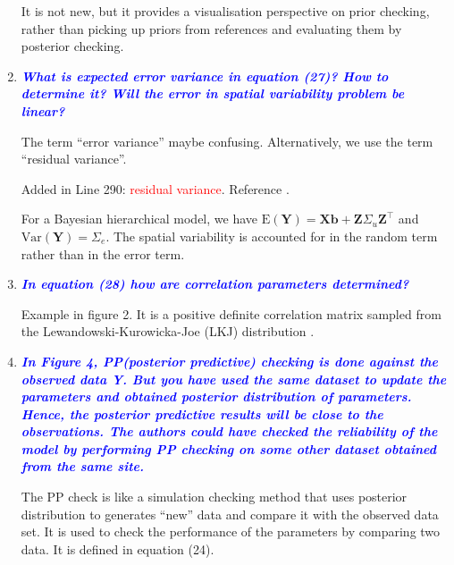 \documentclass[a4paper]{article}   	%
\newcommand{\E}{\mathrm{E}}
\newcommand{\Var}{\mathrm{Var}}
\newcommand{\qtitle}[1]{\textit{\textbf{#1}}}
\begin{document}
\begin{enumerate}
    It is not new, but it provides a visualisation perspective on prior checking, rather than picking up priors from references and evaluating them by posterior checking. 
    
    \item \qtitle{\textcolor{blue}{What is expected error variance in equation (27)? How to determine it? Will the error in spatial variability problem be linear?}}
    
	The term ``error variance'' maybe confusing. Alternatively, we use the term ``residual variance''. 
	
	Added in Line 290: \textcolor{red}{residual variance}. Reference \textcite{Gabry2019Visualization}. 
	
	For a Bayesian hierarchical model, we have $\E(\bm{Y}) = \bm{X}\bm{b} + \bm{Z}\Sigma_u\bm{Z}^\top$ and $\Var(\bm{Y}) = \Sigma_e$. The spatial variability is accounted for in the random term rather than in the error term. 
    
    \item \qtitle{\textcolor{blue}{In equation (28) how are correlation parameters determined?}}
    
    Example in figure 2. It is a positive definite correlation matrix sampled from the Lewandowski-Kurowicka-Joe (LKJ) distribution \parencite{Lewandowski2009Generating, McElreath2015Statistical}. 
    
    \item \qtitle{\textcolor{blue}{In Figure 4, PP(posterior predictive) checking is done against the observed data Y. But you have used the same dataset to update the parameters and obtained posterior distribution of parameters. Hence, the posterior predictive results will be close to the observations. The authors could have checked the reliability of the model by performing PP checking on some other dataset obtained from the same site.}}
    
    The PP check is like a simulation checking method that uses posterior distribution to generates ``new'' data and compare it with the observed data set. It is used to check the performance of the parameters by comparing two data. It is defined in equation (24). 
    
    
\end{enumerate}

\renewcommand\bibname{References}%
\printbibliography
\end{document}
